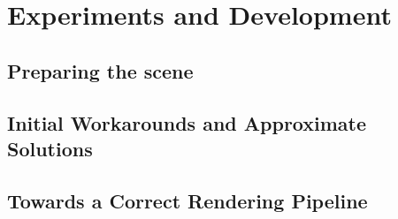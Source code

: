 \documentclass[12pt]{article}
\begin{document}
\section{Experiments and Development}
\subsection{Preparing the scene}
\subsection{Initial Workarounds and Approximate Solutions}
\subsection{Towards a Correct Rendering Pipeline}

\printbibliography
\end{document}
